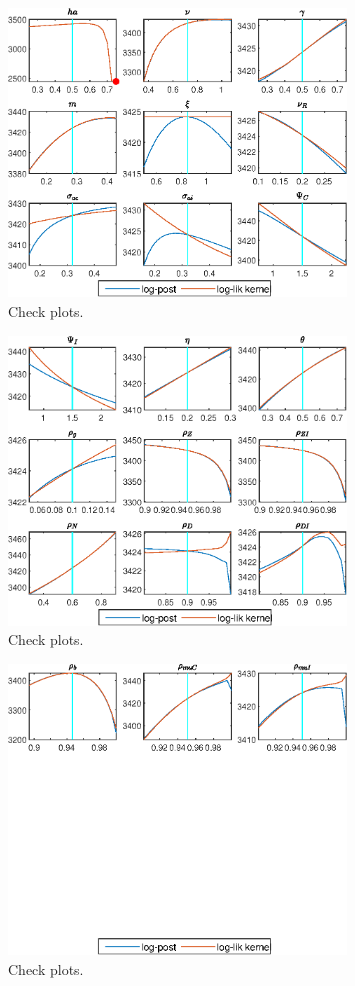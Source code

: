 \begin{figure}[H]
\centering 
\includegraphics[width=0.80\textwidth]{BRS_sectoral_rest/graphs/BRS_sectoral_rest_CheckPlots3}
\caption{Check plots.}\label{Fig:CheckPlots:3}
\end{figure}
 
\begin{figure}[H]
\centering 
\includegraphics[width=0.80\textwidth]{BRS_sectoral_rest/graphs/BRS_sectoral_rest_CheckPlots4}
\caption{Check plots.}\label{Fig:CheckPlots:4}
\end{figure}
 
\begin{figure}[H]
\centering 
\includegraphics[width=0.80\textwidth]{BRS_sectoral_rest/graphs/BRS_sectoral_rest_CheckPlots5}
\caption{Check plots.}\label{Fig:CheckPlots:5}
\end{figure}
 
